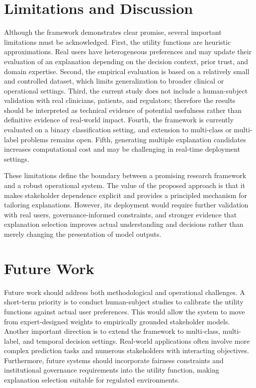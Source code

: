 \documentclass{article}
\begin{document}
\section{Limitations and Discussion}

Although the framework demonstrates clear promise, several important limitations must be acknowledged. First, the utility functions are heuristic approximations. Real users have heterogeneous preferences and may update their evaluation of an explanation depending on the decision context, prior trust, and domain expertise. Second, the empirical evaluation is based on a relatively small and controlled dataset, which limits generalization to broader clinical or operational settings. Third, the current study does not include a human-subject validation with real clinicians, patients, and regulators; therefore the results should be interpreted as technical evidence of potential usefulness rather than definitive evidence of real-world impact. Fourth, the framework is currently evaluated on a binary classification setting, and extension to multi-class or multi-label problems remains open. Fifth, generating multiple explanation candidates increases computational cost and may be challenging in real-time deployment settings.

These limitations define the boundary between a promising research framework and a robust operational system. The value of the proposed approach is that it makes stakeholder dependence explicit and provides a principled mechanism for tailoring explanations. However, its deployment would require further validation with real users, governance-informed constraints, and stronger evidence that explanation selection improves actual understanding and decisions rather than merely changing the presentation of model outputs.

\section{Future Work}

Future work should address both methodological and operational challenges. A short-term priority is to conduct human-subject studies to calibrate the utility functions against actual user preferences. This would allow the system to move from expert-designed weights to empirically grounded stakeholder models. Another important direction is to extend the framework to multi-class, multi-label, and temporal decision settings. Real-world applications often involve more complex prediction tasks and numerous stakeholders with interacting objectives. Furthermore, future systems should incorporate fairness constraints and institutional governance requirements into the utility function, making explanation selection suitable for regulated environments.
\end{document}

